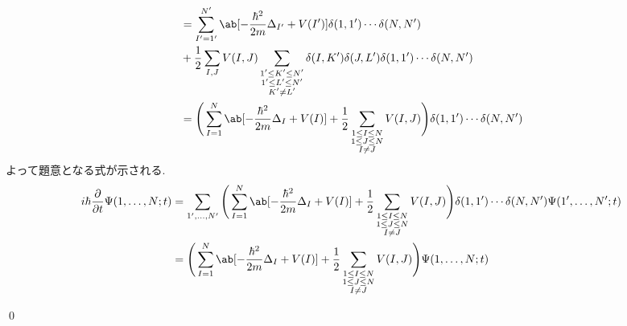 \documentclass[uplatex,dvipdfmx,a4paper,11pt]{jlreq}
\makeatletter
\numberwithin{equation}{section}
\theoremstyle{definition}
\renewenvironment{proof}[1][\proofname]{\par
  \normalfont
  \topsep6\p@\@plus6\p@ \trivlist
  \item[\hskip\labelsep{\bfseries #1}\@addpunct{\bfseries}]\ignorespaces\quad\par
}{
  \qed\endtrivlist\@endpefalse
}
\renewcommand\proofname{証明}
\makeatother
\begin{document}
\begin{proof}
\begin{align}
                                      & = \sum_{I' = 1'}^{N'}\ab[-\frac{\hbar^2}{2m}\Delta_{I'} + V(I')]\delta(1, 1')\cdots\delta(N, N')             \\
                                      & + \frac{1}{2}\sum_{I,J}V(I, J)\sum_{\substack{1'\leq K'\leq N'                                               \\ 1'\leq L'\leq N' \\ K' \neq L'}}\delta(I, K')\delta(J, L')\delta(1, 1')\cdots\delta(N, N') \\
                                      & = \Bigg(\sum_{I = 1}^{N}\ab[-\frac{\hbar^2}{2m}\Delta_{I} + V(I)] + \frac{1}{2}\sum_{\substack{1\leq I\leq N \\ 1\leq J\leq N \\ I \neq J}}V(I, J)\Bigg)\delta(1, 1')\cdots\delta(N, N')
  \end{align}
  よって題意となる式が示される.
  \begin{align}
    i\hbar\diffp{}{t}\Psi(1,\ldots,N; t) & = \sum_{1',\ldots,N'}\Bigg(\sum_{I = 1}^{N}\ab[-\frac{\hbar^2}{2m}\Delta_{I} + V(I)] + \frac{1}{2}\sum_{\substack{1\leq I\leq N \\ 1\leq J\leq N \\ I \neq J}}V(I, J)\Bigg)\delta(1, 1')\cdots\delta(N, N')\Psi(1',\ldots,N'; t) \\
                                         & = \Bigg(\sum_{I = 1}^{N}\ab[-\frac{\hbar^2}{2m}\Delta_{I} + V(I)] + \frac{1}{2}\sum_{\substack{1\leq I\leq N                    \\ 1\leq J\leq N \\ I \neq J}}V(I, J)\Bigg)\Psi(1,\ldots,N; t)
  \end{align}
\end{proof}
\end{document}
